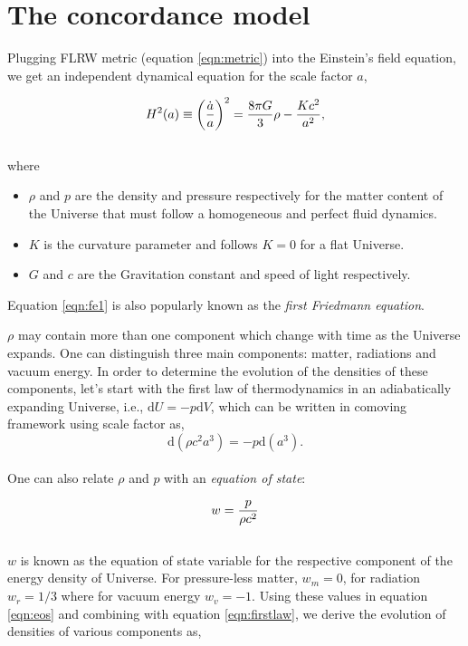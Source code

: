 \documentclass[
  11pt,
  twoside,
  openright,
  titlepage,
  headings=optiontoheadandtoc
]{scrbook}
\begin{document}
\section{The concordance model}


Plugging FLRW metric (equation \ref{eqn:metric}) into the Einstein's field equation, 
we get an independent dynamical equation
for the scale factor $a$,

\begin{equation}
\centering
H^2(a) \equiv \left( \dfrac{\dot{a}}{a} \right)^2 = 
			\dfrac{8 \pi G}{3} \rho - \dfrac{Kc^2}{a^2},
\label{eqn:fe1}
\end{equation}
\\
where
\begin{itemize}
\item$\rho$ and $p$ are the density and pressure respectively for the matter content
of the Universe that must follow a homogeneous and perfect fluid dynamics. 
\item $K$ is the curvature parameter and follows $K=0$ for a flat Universe. 
\item $G$ and $c$ are
the Gravitation constant and speed of light respectively. 
\end{itemize}
Equation \ref{eqn:fe1} is 
also popularly known as the {\it first Friedmann equation}.

$\rho$ may contain more than one component which change with time as the Universe 
expands. One can distinguish three main components: matter, radiations and vacuum 
energy. In order to determine the evolution of the densities of these components,
let's start with the first law of thermodynamics in an adiabatically expanding Universe,
i.e., $\mathrm{d}U = -p\mathrm{d}V$, which can be written in comoving framework
using scale factor as,
\begin{equation}
	\mathrm{d}(\rho c^2 a^3) = -p \mathrm{d} (a^3).
	\label{eqn:firstlaw}
\end{equation}
\\
One can also relate $\rho$ and $p$ with an {\it equation of state}:

\begin{equation}
\centering
w = \dfrac{p}{\rho c^2}
\label{eqn:eos}
\end{equation}
\\
$w$ is known as the equation of state variable for the respective component
of the energy density of Universe. For pressure-less matter, $w_m=0$,
for radiation $w_r=1/3$ where for vacuum energy $w_v=-1$. Using these values 
in equation \ref{eqn:eos} and combining with equation \ref{eqn:firstlaw}, we 
derive the evolution of densities of various components as,
\end{document}
